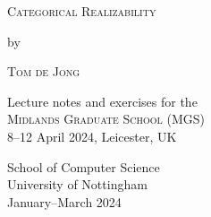 \begin{titlepage}
\begin{center}

  \large %

  {\Huge\textsc{Categorical Realizability}\par}


  by


  {\huge\textsc{Tom de Jong}}


  {\Large{Lecture notes and exercises for the\\
      \textsc{Midlands Graduate School (MGS)}}} \\
  8--12 April 2024, Leicester, UK



  \makeicon

  \vfill

  \flushright
  {\normalsize{School of Computer Science \\
  University of Nottingham \\
  January--March 2024}}

\end{center}
\end{titlepage}

